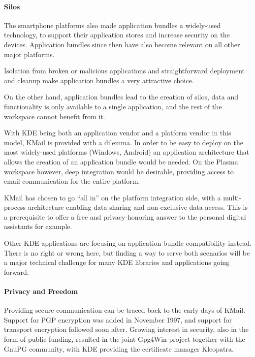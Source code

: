 \paragraph{Silos}

The smartphone platforms also made application bundles a widely-used technology, to support their application stores and increase security on the devices. Application bundles since then have also become relevant on all other major platforms.

Isolation from broken or malicious applications and straightforward deployment and cleanup make application bundles a very attractive choice.

On the other hand, application bundles lead to the creation of silos, data and functionality is only available to a single application, and the rest of the workspace cannot benefit from it.

With KDE being both an application vendor and a platform vendor in this model, KMail is provided with a dilemma. In order to be easy to deploy on the most widely-used platforms (Windows, Android) an application architecture that allows the creation of an application bundle would be needed. On the Plasma workspace however, deep integration would be desirable, providing access to email communication for the entire platform.

KMail has chosen to go “all in” on the platform integration side, with a multi-process architecture enabling data sharing and non-exclusive data access. This is a prerequisite to offer a free and privacy-honoring answer to the personal digital assistants for example.

Other KDE applications are focusing on application bundle compatibility instead. There is no right or wrong here, but finding a way to serve both scenarios will be a major technical challenge for many KDE libraries and applications going forward.

\paragraph{Privacy and Freedom}

Providing secure communication can be traced back to the early days of KMail. Support for PGP encryption was added in November 1997, and support for transport encryption followed soon after. Growing interest in security, also in the form of public funding, resulted in the joint Gpg4Win project together with the GnuPG community, with KDE providing the certificate manager Kleopatra.

